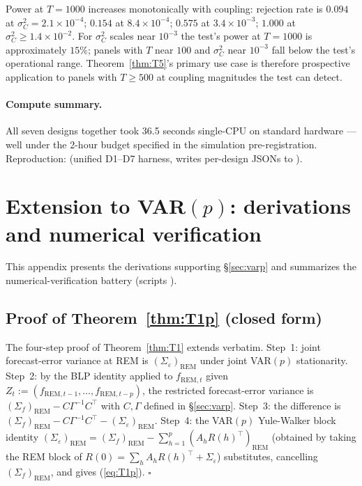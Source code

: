 \documentclass[11pt,letterpaper]{article}
\theoremstyle{remark}
\newcommand{\REM}{\mathrm{REM}}
\newcommand{\Sigmaf}{\Sigma_f}
\newcommand{\Sigmae}{\Sigma_\varepsilon}
\newcommand{\sigC}{\sigma^2_C}
\begin{document}
Power at $T = 1000$ increases monotonically with coupling: rejection rate is $0.094$ at $\sigC = 2.1 \times 10^{-4}$; $0.154$ at $8.4 \times 10^{-4}$; $0.575$ at $3.4 \times 10^{-3}$; $1.000$ at $\sigC \ge 1.4 \times 10^{-2}$. For $\sigC$ scales near $10^{-3}$ the test's power at $T = 1000$ is approximately $15\%$; panels with $T$ near $100$ and $\sigC$ near $10^{-3}$ fall below the test's operational range. Theorem~\ref{thm:T5}'s primary use case is therefore prospective application to panels with $T \ge 500$ at coupling magnitudes the test can detect.

\paragraph{Compute summary.} All seven designs together took 36.5 seconds single-CPU on standard hardware --- well under the 2-hour budget specified in the simulation pre-registration. Reproduction:  (unified D1--D7 harness, writes per-design JSONs to ).

\section{Extension to VAR$(p)$: derivations and numerical verification}\label{app:VARp}

This appendix presents the derivations supporting \S\ref{sec:varp} and summarizes the numerical-verification battery (scripts ).

\subsection{Proof of Theorem~\ref{thm:T1p} (closed form)}

The four-step proof of Theorem~\ref{thm:T1} extends verbatim. Step~1: joint forecast-error variance at REM is $(\Sigmae)_\REM$ under joint VAR$(p)$ stationarity. Step~2: by the BLP identity applied to $f_{\REM, t}$ given $Z_t := (f_{\REM, t-1}, \ldots, f_{\REM, t-p})$, the restricted forecast-error variance is $(\Sigmaf)_\REM - C \Gamma^{-1} C^\top$ with $C, \Gamma$ defined in \S\ref{sec:varp}. Step~3: the difference is $(\Sigmaf)_\REM - C \Gamma^{-1} C^\top - (\Sigmae)_\REM$. Step~4: the VAR$(p)$ Yule-Walker block identity $(\Sigmae)_\REM = (\Sigmaf)_\REM - \sum_{h=1}^p (A_h R(h)^\top)_\REM$ (obtained by taking the REM block of $R(0) = \sum_h A_h R(h)^\top + \Sigmae$) substitutes, cancelling $(\Sigmaf)_\REM$, and gives (\ref{eq:T1p}). $\square$
\end{document}
